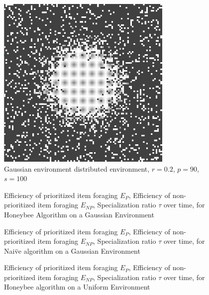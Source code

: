 \begin{figure}[!htb]
\centering
\includegraphics[width=0.75\textwidth]{chapters/chapter6/figures/flexibility-gaussian-obj90-ratio.PNG}
\caption{Gaussian environment distributed environment, $r=0.2$, $p=90$, $s=100$}
\label{fig:gaussianhighdensityenv}
\end{figure}

\begin{figure}[!htb]
\centering
\small
\resizebox{\textwidth}{!}{}
\caption{Efficiency of prioritized item foraging $E_P$, Efficiency of non-prioritized item foraging $E_{NP}$, Specialization ratio $\tau$ over time, for Honeybee Algorithm on a Gaussian Environment}
\label{fig:gaussianhighdensityperformancehoneybee}
\end{figure}

\begin{figure}[!htb]
\centering
\small
\resizebox{\textwidth}{!}{}
\caption{Efficiency of prioritized item foraging $E_P$, Efficiency of non-prioritized item foraging $E_{NP}$, Specialization ratio $\tau$ over time, for Nai\"ve algorithm on a Gaussian Environment}
\label{fig:gaussianhighdensityperformancenaive}
\end{figure}

\begin{figure}[!htb]
\centering
\small
\resizebox{\textwidth}{!}{}
\caption{Efficiency of prioritized item foraging $E_P$, Efficiency of non-prioritized item foraging $E_{NP}$, Specialization ratio $\tau$ over time, for Honeybee algorithm on a Uniform Environment}
\label{fig:uniformhighdensityperformancehoneybee}
\end{figure}


